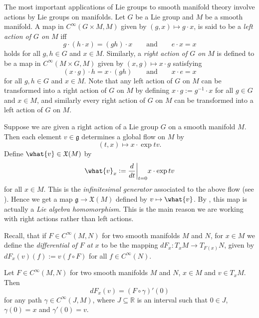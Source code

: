 The most important applications of Lie groups to smooth manifold theory involve actions by Lie groups on manifolds. Let $G$ be a Lie group and $M$ be a smooth manifold. A map in $C^\infty(G \times M,M)$ given by $(g,x) \mapsto g \cdot x$, is said to be a \emph{left action of $G$ on $M$} iff
\begin{equation*}
	g \cdot (h \cdot x) = (gh) \cdot x \qquad \text{and} \qquad e \cdot x = x
\end{equation*}
\noindent holds for all $g,h \in G$ and $x \in M$. Similarly, a \emph{right action of $G$ on $M$} is defined to be a map in $C^\infty(M \times G,M)$ given by $(x,g) \mapsto x \cdot g$ satisfying
\begin{equation*}
	(x \cdot g) \cdot h = x \cdot (gh) \qquad \text{and} \qquad x \cdot e = x
\end{equation*}
\noindent for all $g,h \in G$ and $x \in M$. Note that any left action of $G$ on $M$ can be transformed into a right action of $G$ on $M$ by defining $x \cdot g := g^{-1} \cdot x$ for all $g \in G$ and $x \in M$, and similarly every right action of $G$ on $M$ can  be transformed into a left action of $G$ on $M$. 

Suppose we are given a right action of a Lie group $G$ on a smooth manifold $M$. Then each element $v \in \mathfrak{g}$ determines a global flow on $M$ by
\begin{equation*}
	(t,x) \mapsto x \cdot \exp tv.
\end{equation*}
Define $\what{v} \in \mathfrak{X}(M)$ by
\begin{equation*}
	\what{v}_x := \frac{d}{dt}\bigg\vert_{t = 0} x \cdot \exp tv
\end{equation*}
\noindent for all $x \in M$. This is the \emph{infinitesimal generator} associated to the above flow (see \cite[210]{lee:smooth_manifolds:2013}). Hence we get a map $\mathfrak{g} \to \mathfrak{X}(M)$ defined by $v \mapsto \what{v}$. By \cite[526]{lee:smooth_manifolds:2013}, this map is actually a \emph{Lie algebra homomorphism}. This is the main reason we are working with right actions rather than left actions. 

Recall, that if $F \in C^\infty(M,N)$ for two smooth manifolds $M$ and $N$, for $x \in M$ we define the \emph{differential of $F$ at $x$} to be the mapping $dF_x : T_xM \to T_{F(x)}N$, given by $dF_x(v)(f) := v(f \circ F)$ for all $f \in C^\infty(N)$.

\begin{lemma}
	\label{lem:computing_the_differential_using_a_velocity_vector}
	Let $F \in C^\infty(M,N)$ for two smooth manifolds $M$ and $N$, $x \in M$ and $v \in T_xM$. Then
	\begin{equation*}
		dF_x(v) = (F \circ \gamma)'(0)
	\end{equation*}
	\noindent for any path $\gamma \in C^\infty(J,M)$, where $J \subseteq \mathbb{R}$ is an interval such that $0 \in J$, $\gamma(0) = x$ and $\gamma'(0) = v$.
\end{lemma}

